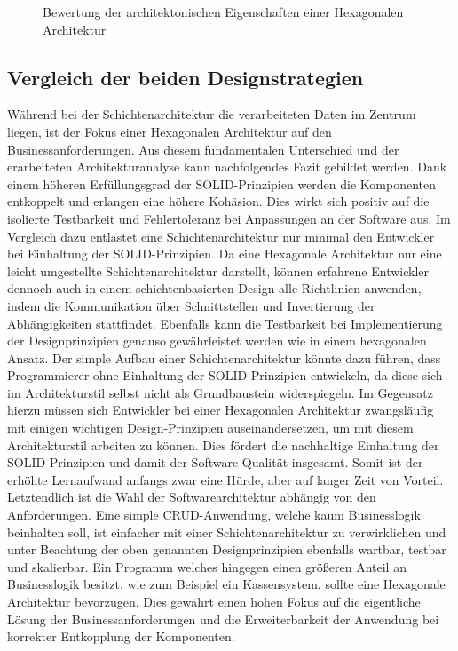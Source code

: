 \documentclass[conference]{IEEEtran}
\begin{document}
\begin{figure}[htbp]
	
	\caption{Bewertung der architektonischen Eigenschaften einer Hexagonalen Architektur}	
	\label{fig:HexagonaleArchitekturBewertung}
\end{figure}

\subsection{Vergleich der beiden Designstrategien}

Während bei der Schichtenarchitektur die verarbeiteten Daten im Zentrum liegen, ist der Fokus einer Hexagonalen Architektur auf den Businessanforderungen. Aus diesem fundamentalen Unterschied und der erarbeiteten Architekturanalyse kann nachfolgendes Fazit gebildet werden. Dank einem höheren Erfüllungsgrad der SOLID-Prinzipien werden die Komponenten entkoppelt und erlangen eine höhere Kohäsion. Dies wirkt sich positiv auf die isolierte Testbarkeit und Fehlertoleranz bei Anpassungen an der Software aus. Im Vergleich dazu entlastet eine Schichtenarchitektur nur minimal den Entwickler bei Einhaltung der SOLID-Prinzipien. Da eine Hexagonale Architektur nur eine leicht umgestellte Schichtenarchitektur darstellt, können erfahrene Entwickler dennoch auch in einem schichtenbasierten Design alle Richtlinien anwenden, indem die Kommunikation über Schnittstellen und Invertierung der Abhängigkeiten stattfindet. Ebenfalls kann die Testbarkeit bei Implementierung der Designprinzipien genauso gewährleistet werden wie in einem hexagonalen Ansatz. Der simple Aufbau einer Schichtenarchitektur könnte dazu führen, dass Programmierer ohne Einhaltung der SOLID-Prinzipien entwickeln, da diese sich im Architekturstil selbst nicht als Grundbaustein widerspiegeln. Im Gegensatz hierzu müssen sich Entwickler bei einer Hexagonalen Architektur zwangsläufig mit einigen wichtigen Design-Prinzipien auseinandersetzen, um mit diesem Architekturstil arbeiten zu können. Dies fördert die nachhaltige Einhaltung der SOLID-Prinzipien und damit der Software Qualität insgesamt. Somit ist der erhöhte Lernaufwand anfangs zwar eine Hürde, aber auf langer Zeit von Vorteil. Letztendlich ist die Wahl der Softwarearchitektur abhängig von den Anforderungen. Eine simple CRUD-Anwendung, welche kaum Businesslogik beinhalten soll, ist einfacher mit einer Schichtenarchitektur zu verwirklichen und unter Beachtung der oben genannten Designprinzipien ebenfalls wartbar, testbar und skalierbar. Ein Programm welches hingegen einen größeren Anteil an Businesslogik besitzt, wie zum Beispiel ein Kassensystem, sollte eine Hexagonale Architektur bevorzugen. Dies gewährt einen hohen Fokus auf die eigentliche Lösung der Businessanforderungen und die Erweiterbarkeit der Anwendung bei korrekter Entkopplung der Komponenten.


\printbibliography
\end{document}
